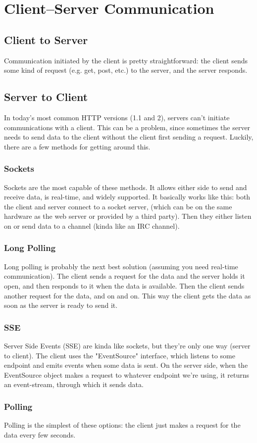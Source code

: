 \documentclass[a4paper,12pt,titlepage,oneside,final]{book}
\begin{document}
\chapter{Client--Server Communication}

\section{Client to Server}
Communication initiated by the client is pretty straightforward: the client sends some kind of request (e.g. get, post, etc.) to the server, and the server responds. 

\section{Server to Client}
In today's most common HTTP versions (1.1 and 2), servers can't initiate communications with a client. This can be a problem, since sometimes the server needs to send data to the client without the client first sending a request. Luckily, there are a few methods for getting around this.

\subsection{Sockets}
Sockets are the most capable of these methods. It allows either side to send and receive data, is real-time, and widely supported. It basically works like this: both the client and server connect to a socket server, (which can be on the same hardware as the web server or provided by a third party). Then they either listen on or send data to a channel (kinda like an IRC channel).

\subsection{Long Polling}
Long polling is probably the next best solution (assuming you need real-time communication). The client sends a request for the data and the server holds it open, and then responds to it when the data is available. Then the client sends another request for the data, and on and on. This way the client gets the data as soon as the server is ready to send it.

\subsection{SSE}

Server Side Events (SSE) are kinda like sockets, but they're only one way (server to client). The client uses the "EventSource" interface, which listens to some endpoint and emits events when some data is sent. On the server side, when the EventSource object makes a request to whatever endpoint we're using, it returns an event-stream, through which it sends data.


\subsection{Polling}
Polling is the simplest of these options: the client just makes a request for the data every few seconds.
\end{document}
